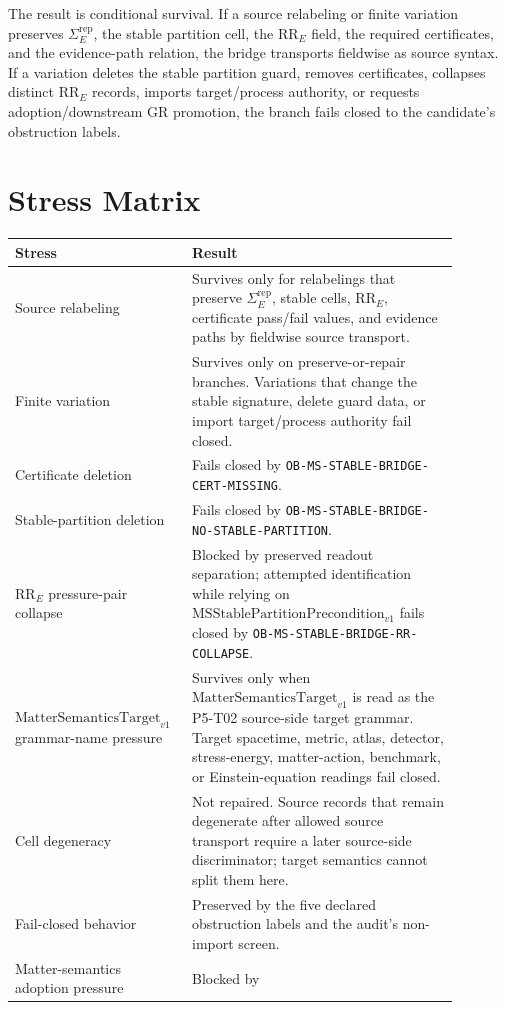 \documentclass[11pt]{article}
\newcommand{\MSStablePre}{\mathrm{MSStablePartitionPrecondition}_{v1}}
\newcommand{\MSSig}{\Sigma^{\mathrm{rep}}_E}
\newcommand{\Target}{\mathrm{MatterSemanticsTarget}_{v1}}
\begin{document}
The result is conditional survival. If a source relabeling or finite variation
preserves \(\MSSig\), the stable partition cell, the \(\mathrm{RR}_E\) field,
the required certificates, and the evidence-path relation, the bridge
transports fieldwise as source syntax. If a variation deletes the stable
partition guard, removes certificates, collapses distinct \(\mathrm{RR}_E\)
records, imports target/process authority, or requests adoption/downstream GR
promotion, the branch fails closed to the candidate's obstruction labels.

\section{Stress Matrix}

\begin{longtable}{p{0.30\linewidth}p{0.58\linewidth}}
\toprule
Stress & Result \\
\midrule
Source relabeling & Survives only for relabelings that preserve
\(\MSSig\), stable cells, \(\mathrm{RR}_E\), certificate pass/fail values,
and evidence paths by fieldwise source transport. \\
Finite variation & Survives only on preserve-or-repair branches. Variations
that change the stable signature, delete guard data, or import target/process
authority fail closed. \\
Certificate deletion & Fails closed by
\texttt{OB-MS-STABLE-BRIDGE-CERT-MISSING}. \\
Stable-partition deletion & Fails closed by
\texttt{OB-MS-STABLE-BRIDGE-NO-STABLE-PARTITION}. \\
\(\mathrm{RR}_E\) pressure-pair collapse & Blocked by preserved readout
separation; attempted identification while relying on \(\MSStablePre\) fails
closed by \texttt{OB-MS-STABLE-BRIDGE-RR-COLLAPSE}. \\
\(\Target\) grammar-name pressure & Survives only when \(\Target\) is read as
the P5-T02 source-side target grammar. Target spacetime, metric, atlas,
detector, stress-energy, matter-action, benchmark, or Einstein-equation
readings fail closed. \\
Cell degeneracy & Not repaired. Source records that remain degenerate after
allowed source transport require a later source-side discriminator; target
semantics cannot split them here. \\
Fail-closed behavior & Preserved by the five declared obstruction labels and
the audit's non-import screen. \\
Matter-semantics adoption pressure & Blocked by

\end{longtable}
\end{document}
